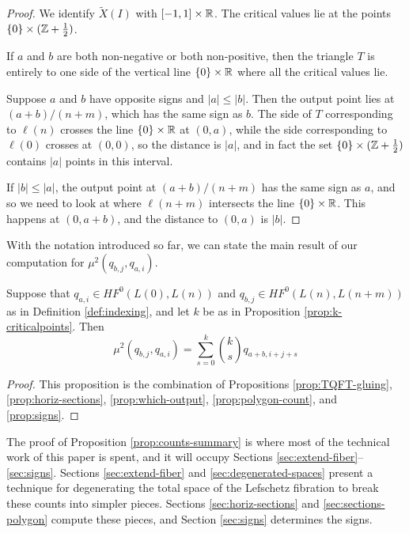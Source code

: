 \documentclass[12pt]{amsart}
\begin{document}
\begin{proof}
  We identify $\tilde{X}(I)$ with $[-1,1]\times \mathbb{R}$. The critical
  values lie at the points $\{0\} \times (\mathbb{Z} + \frac{1}{2})$.

  If $a$ and $b$ are both non-negative or both non-positive, then the
  triangle $T$ is entirely to one side of the vertical line $\{0\}
  \times \mathbb{R}$ where all the critical values lie.

  Suppose $a$ and $b$ have opposite signs and $|a| \leq |b|$. Then the
  output point lies at $(a+b)/(n+m)$, which has the same sign as
  $b$. The side of $T$ corresponding to $\ell(n)$ crosses the line
  $\{0\}\times \mathbb{R}$ at $(0,a)$, while the side corresponding to
  $\ell(0)$ crosses at $(0,0)$, so the distance is $|a|$, and in fact
  the set $\{0\} \times (\mathbb{Z}+\frac{1}{2})$ contains $|a|$ points in
  this interval.

  If $|b| \leq |a|$, the output point at $(a+b)/(n+m)$ has the same
  sign as $a$, and so we need to look at where $\ell(n+m)$ intersects
  the line $\{0\}\times \mathbb{R}$. This happens at $(0,a+b)$, and the
  distance to $(0,a)$ is $|b|$.
\end{proof}

With the notation introduced so far, we can state the main result of
our computation for $\mu^2(q_{b,j},q_{a,i})$. 

\begin{proposition}
  \label{prop:counts-summary}
  Suppose that $q_{a,i} \in HF^0(L(0),L(n))$ and $q_{b,j} \in
  HF^0(L(n),L(n+m))$ as in Definition \ref{def:indexing}, and let $k$ be as in
  Proposition \ref{prop:k-criticalpoints}. Then
  \begin{equation}
    \mu^2(q_{b,j},q_{a,i}) = \sum_{s=0}^k \binom{k}{s}q_{a+b,i+j+s}
  \end{equation}
\end{proposition}

\begin{proof}
  This proposition is the combination of Propositions
  \ref{prop:TQFT-gluing}, \ref{prop:horiz-sections},
  \ref{prop:which-output}, \ref{prop:polygon-count}, and \ref{prop:signs}.
\end{proof}

The proof of Proposition \ref{prop:counts-summary} is where most of the technical work of this paper is spent, and it will occupy Sections \ref{sec:extend-fiber}--\ref{sec:signs}. Sections \ref{sec:extend-fiber} and \ref{sec:degenerated-spaces} present a technique for degenerating the total space of the Lefschetz fibration to break these counts into simpler pieces. Sections \ref{sec:horiz-sections} and \ref{sec:sections-polygon} compute these pieces, and Section \ref{sec:signs} determines the signs.
\end{document}
